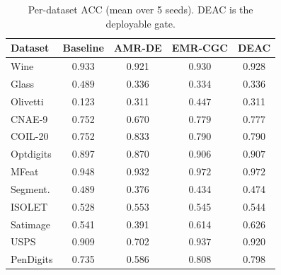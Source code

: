 \begin{table}[htbp]
\centering
\caption{Per-dataset ACC (mean over 5 seeds). DEAC is the deployable gate.}
\label{tab:acc_per_dataset}
\footnotesize
\setlength{\tabcolsep}{4pt}
\begin{tabular}{lcccc}
\toprule
Dataset & Baseline & AMR-DE & EMR-CGC & \textbf{DEAC} \\
\midrule
Wine & $\mathbf{0.933}$ & 0.921 & 0.930 & 0.928 \\
Glass & $\mathbf{0.489}$ & 0.336 & 0.334 & 0.336 \\
Olivetti & 0.123 & 0.311 & $\mathbf{0.447}$ & 0.311 \\
CNAE-9 & 0.752 & 0.670 & $\mathbf{0.779}$ & 0.777 \\
COIL-20 & 0.752 & $\mathbf{0.833}$ & 0.790 & 0.790 \\
Optdigits & 0.897 & 0.870 & 0.906 & $\mathbf{0.907}$ \\
MFeat & 0.948 & 0.932 & $\mathbf{0.972}$ & $\mathbf{0.972}$ \\
Segment. & $\mathbf{0.489}$ & 0.376 & 0.434 & 0.474 \\
ISOLET & 0.528 & $\mathbf{0.553}$ & 0.545 & 0.544 \\
Satimage & 0.541 & 0.391 & 0.614 & $\mathbf{0.626}$ \\
USPS & 0.909 & 0.702 & $\mathbf{0.937}$ & 0.920 \\
PenDigits & 0.735 & 0.586 & $\mathbf{0.808}$ & 0.798 \\
\bottomrule
\end{tabular}
\end{table}
